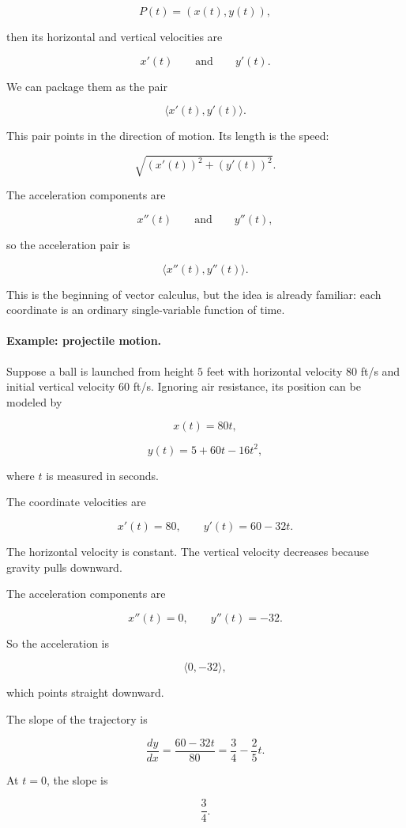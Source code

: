 \[
P(t)=(x(t),y(t)),
\]

then its horizontal and vertical velocities are

\[
x'(t)
\qquad\text{and}\qquad
y'(t).
\]

We can package them as the pair

\[
\langle x'(t),y'(t)\rangle.
\]

This pair points in the direction of motion.  Its length is the speed:

\[
\sqrt{(x'(t))^2+(y'(t))^2}.
\]

The acceleration components are

\[
x''(t)
\qquad\text{and}\qquad
y''(t),
\]

so the acceleration pair is

\[
\langle x''(t),y''(t)\rangle.
\]

This is the beginning of vector calculus, but the idea is already familiar: each
coordinate is an ordinary single-variable function of time.

\paragraph{Example: projectile motion.}
Suppose a ball is launched from height \(5\) feet with horizontal velocity \(80\) ft/s
and initial vertical velocity \(60\) ft/s.  Ignoring air resistance, its position can be
modeled by

\[
x(t)=80t,
\]

\[
y(t)=5+60t-16t^2,
\]

where \(t\) is measured in seconds.

The coordinate velocities are

\[
x'(t)=80,
\qquad
y'(t)=60-32t.
\]

The horizontal velocity is constant.  The vertical velocity decreases because gravity pulls
downward.

The acceleration components are

\[
x''(t)=0,
\qquad
y''(t)=-32.
\]

So the acceleration is

\[
\langle 0,-32\rangle,
\]

which points straight downward.

The slope of the trajectory is

\[
\frac{dy}{dx}
=
\frac{60-32t}{80}
=
\frac34-\frac25t.
\]

At \(t=0\), the slope is

\[
\frac34.
\]

